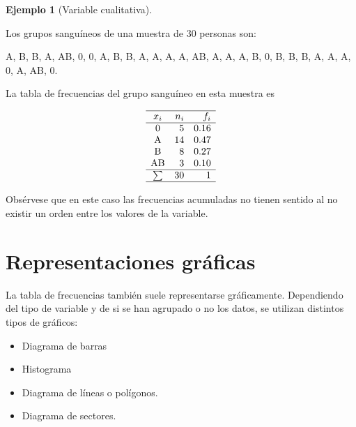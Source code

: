 \documentclass[
  a4paper,
]{scrreport}
\theoremstyle{definition}
\theoremstyle{definition}
\newtheorem{example}{Ejemplo}[chapter]
\theoremstyle{plain}
\theoremstyle{remark}
\begin{document}
\begin{example}[Variable
cualitativa]\protect\hypertarget{exm-tabla-frecuencias-cualitativa}{}\label{exm-tabla-frecuencias-cualitativa}

Los grupos sanguíneos de una muestra de 30 personas son:

A, B, B, A, AB, 0, 0, A, B, B, A, A, A, A, AB, A, A, A, B, 0, B, B, B,
A, A, A, 0, A, AB, 0.

La tabla de frecuencias del grupo sanguíneo en esta muestra es

\[
\begin{array}{crr}
\hline
x_i & n_i & f_i \\
\hline
\mbox{0} & 5 & 0.16 \\
\mbox{A} & 14 & 0.47 \\
\mbox{B} & 8 & 0.27 \\
\mbox{AB} & 3 & 0.10 \\
\hline
\sum & 30 & 1 \\
\hline
\end{array}
\]

\end{example}

\begin{tcolorbox}[enhanced jigsaw, colbacktitle=quarto-callout-warning-color!10!white, toptitle=1mm, colback=white, toprule=.15mm, bottomrule=.15mm, rightrule=.15mm, left=2mm, colframe=quarto-callout-warning-color-frame, coltitle=black, bottomtitle=1mm, arc=.35mm, titlerule=0mm, title=\textcolor{quarto-callout-warning-color}{\faExclamationTriangle}\hspace{0.5em}{Advertencia}, breakable, opacitybacktitle=0.6, leftrule=.75mm, opacityback=0]

Obsérvese que en este caso las frecuencias acumuladas no tienen sentido
al no existir un orden entre los valores de la variable.

\end{tcolorbox}

\hypertarget{representaciones-gruxe1ficas}{%
\section{Representaciones gráficas}\label{representaciones-gruxe1ficas}}

La tabla de frecuencias también suele representarse gráficamente.
Dependiendo del tipo de variable y de si se han agrupado o no los datos,
se utilizan distintos tipos de gráficos:

\begin{itemize}
\item
  Diagrama de barras
\item
  Histograma
\item
  Diagrama de líneas o polígonos.
\item
  Diagrama de sectores.
\end{itemize}
\end{document}
